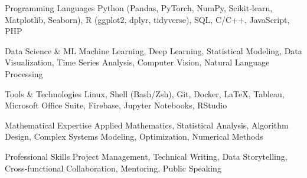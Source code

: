 
\begin{cvskills}

  \cvskill
    {Programming Languages} %
    {Python (Pandas, PyTorch, NumPy, Scikit‑learn, Matplotlib, Seaborn), R (ggplot2, dplyr, tidyverse), SQL, C/C++, JavaScript, PHP} %

  \cvskill
    {Data Science \& ML} %
    {Machine Learning, Deep Learning, Statistical Modeling, Data Visualization, Time Series Analysis, Computer Vision, Natural Language Processing} %

  \cvskill
    {Tools \& Technologies} %
    {Linux, Shell (Bash/Zsh), Git, Docker, \LaTeX, Tableau, Microsoft Office Suite, Firebase, Jupyter Notebooks, RStudio} %

  \cvskill
    {Mathematical Expertise} %
    {Applied Mathematics, Statistical Analysis, Algorithm Design, Complex Systems Modeling, Optimization, Numerical Methods} %

  \cvskill
    {Professional Skills} %
    {Project Management, Technical Writing, Data Storytelling, Cross-functional Collaboration, Mentoring, Public Speaking} %

\end{cvskills}

